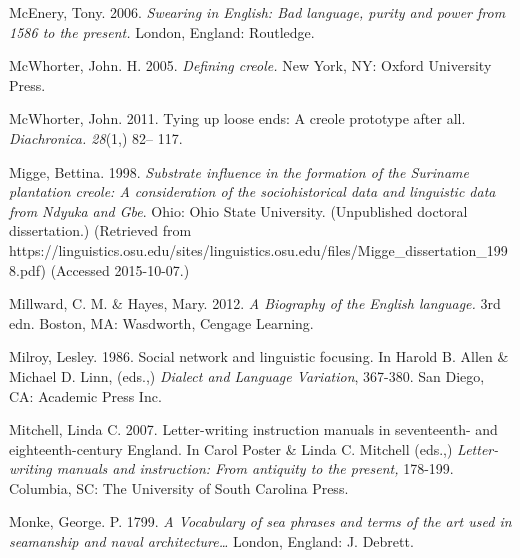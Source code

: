 \begin{styleStandard}
McEnery, Tony. 2006. \textit{Swearing in English: Bad language, purity and power from 1586 to the present. }London, England: Routledge. 
\end{styleStandard}


\begin{styleStandard}
McWhorter, John. H. 2005. \textit{Defining creole. }New York, NY: Oxford University Press.
\end{styleStandard}


\begin{styleStandard}
McWhorter, John. 2011. Tying up loose ends: A creole prototype after all. \textit{Diachronica. 28}(1,) 82– 117. 
\end{styleStandard}


\begin{styleStandard}
Migge, Bettina. 1998. \textit{Substrate influence in the formation of the Suriname plantation creole: A consideration of the sociohistorical data and linguistic data from Ndyuka and Gbe}. Ohio: Ohio State University. (Unpublished doctoral dissertation.) (Retrieved from https://linguistics.osu.edu/sites/linguistics.osu.edu/files/Migge\_dissertation\_1998.pdf) (Accessed 2015-10-07.)
\end{styleStandard}


\begin{styleStandard}
Millward, C. M. \& Hayes, Mary. 2012. \textit{A Biography of the English language.} 3rd edn. Boston, MA: Wasdworth, Cengage Learning. 
\end{styleStandard}


\begin{styleStandard}
Milroy, Lesley. 1986. Social network and linguistic focusing. In Harold B. Allen \& Michael D. Linn, (eds.,) \textit{Dialect and Language Variation}, 367-380. San Diego, CA: Academic Press Inc. 
\end{styleStandard}


\begin{styleStandard}
Mitchell, Linda C. 2007. Letter-writing instruction manuals in seventeenth- and eighteenth-century England. In Carol Poster \& Linda C. Mitchell (eds.,) \textit{Letter-writing manuals and instruction: From antiquity to the present, }178-199. Columbia, SC: The University of South Carolina Press. 
\end{styleStandard}


\begin{styleStandard}
Monke, George. P. 1799. \textit{A Vocabulary of sea phrases and terms of the art used in seamanship and naval architecture… }London, England: J. Debrett.
\end{styleStandard}


